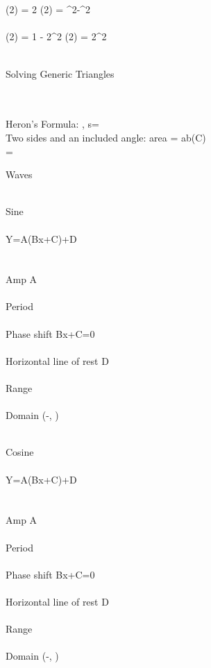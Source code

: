 \documentclass[12pt]{article}
\begin{document}
\begin{center}
\normalsize
\\~\\
\sin (2\theta) = 2\sin \theta \cos \theta \hspace{10mm}
\cos (2\theta) = \cos^2\theta-\sin^2 \theta
\\~\\
\cos (2\theta) = 1 - 2\sin^2\theta \hspace{10mm}
\cos (2\theta) = 2\cos^2

\\[.75in]
\large
Solving Generic Triangles

\normalsize
\\~\\
Heron's Formula: , \hspace{5mm}s=\\[.4in]
Two sides and an included angle: area = ab\sin(C)\\[.4in]
=




\pagebreak
\Large
Waves

\\[.5in]
\large
Sine
\normalsize
\\~\\

Y=A\sin(Bx+C)+D\\
\\~\\
Amp \Rightarrow \abs A
\\~\\
Period \Rightarrow {}
\\~\\
Phase shift \Rightarrow Bx+C=0
\\~\\
Horizontal line of rest \Rightarrow D
\\~\\
Range 
\\~\\
Domain \Rightarrow (-\infty, \infty)

\\[.75in]
\large
Cosine
\normalsize
\\~\\

Y=A\cos(Bx+C)+D\\
\\~\\
Amp \Rightarrow \abs A
\\~\\
Period \Rightarrow {}
\\~\\
Phase shift \Rightarrow Bx+C=0
\\~\\
Horizontal line of rest \Rightarrow D
\\~\\
Range 
\\~\\
Domain \Rightarrow (-\infty, \infty)


\end{center}
\end{document}
